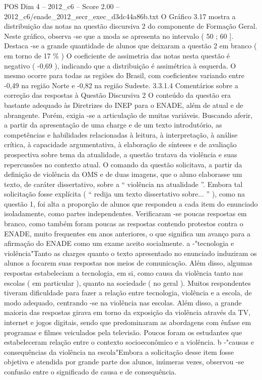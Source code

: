 \begin{textsample}{POS Dim 4 – 2012\_c6 – Score 2.00 – 2012\_c6/enade\_2012\_secr\_exec\_d3dc44a86b.txt}
O Gráfico 3.17 mostra a distribuição das notas na questão discursiva 2 do componente de Formação Geral.
Neste gráfico, observa -se que a moda se apresenta no intervalo ( 50 ; 60 ].
Destaca -se a grande quantidade de alunos que deixaram a questão 2 em branco ( em torno de 17 \% ) O coeficiente de assimetria das notas nesta questão é negativo ( -0,69 ), indicando que a distribuição é assimétrica à esquerda.
O mesmo ocorre para todas as regiões do Brasil, com coeficientes variando entre -0,49 na região Norte e -0,82 na região Sudeste. 3.3.1.4 Comentários sobre a correção das respostas à Questão Discursiva 2 O conteúdo da questão era bastante adequado às Diretrizes do INEP para o ENADE, além de atual e de abrangente.
Porém, exigia -se a articulação de muitas variáveis.
Buscando aferir, a partir da apresentação de uma charge e de um texto introdutório, as competências e habilidades relacionadas à leitura, à interpretação, à análise crítica, à capacidade argumentativa, à elaboração de sínteses e de avaliação prospectiva sobre tema da atualidade, a questão tratava da violência e suas repercussões no contexto atual.
O comando da questão solicitava, a partir da definição de violência da OMS e de duas imagens, que o aluno elaborasse um texto, de caráter dissertativo, sobre a “ violência na atualidade ”.
Embora tal solicitação fosse explícita ( “ redija um texto dissertativo sobre... ” ), como na questão 1, foi alta a proporção de alunos que respondeu a cada item do enunciado isoladamente, como partes independentes.
Verificaram -se poucas respostas em branco, como também foram poucas as respostas contendo protestos contra o ENADE, muito frequentes em anos anteriores, o que significa um avanço para a afirmação do ENADE como um exame aceito socialmente. a -"tecnologia e violência"Tanto as charges quanto o texto apresentado no enunciado induziram os alunos a focarem suas respostas nos meios de comunicação.
Além disso, algumas respostas estabeleciam a tecnologia, em si, como causa da violência tanto nas escolas ( em particular ), quanto na sociedade ( no geral ).
Muitos respondentes tiveram dificuldade para fazer a relação entre tecnologia, violência e a escola, de modo adequado, centrando -se na violência nas escolas.
Além disso, a grande maioria das respostas girava em torno da exposição da violência através da TV, internet e jogos digitais, sendo que predominaram as abordagens com ênfase em programas e filmes veiculados pela televisão.
Poucos foram os estudantes que estabeleceram relação entre o contexto socioeconômico e a violência. b -"causas e consequências da violência na escola"Embora a solicitação desse item fosse objetiva e atendida por grande parte dos alunos, inúmeras vezes, observou -se confusão entre o significado de causa e de consequência.

\end{textsample}
